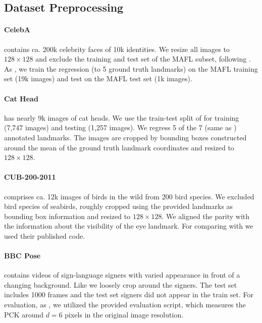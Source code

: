 \subsection{Dataset Preprocessing}
\paragraph{CelebA} \cite{liu15facewild} contains ca. 200k celebrity faces of 10k identities.
We resize all images to $128\times 128$ and exclude the training and test set of the MAFL subset, following \cite{thewlis17}.
As  \cite{thewlis17, zhang18}, we train the regression (to 5 ground truth landmarks) on the MAFL training set (19k images) and test on the MAFL test set (1k images).

\paragraph{Cat Head} \cite{zhang08cathead}  has nearly 9k images of cat heads.
We use the train-test split of \cite{zhang18} for training (7,747 images) and testing (1,257 images).
We regress 5 of the 7 (same as \cite{zhang18}) annotated landmarks.
The images are cropped by bounding boxes constructed around the mean of the ground truth landmark coordinates and resized to $128\times128$.


\paragraph{CUB-200-2011} \cite{wah11birds} comprises ca. 12k images of birds in the wild from 200 bird species.
We excluded bird species of seabirds, roughly cropped using the provided landmarks as bounding box information and resized to $128\times128$.
We aligned the parity with the information about the visibility of the eye landmark.
For comparing with \cite{zhang18} we used their published code.


\paragraph{BBC Pose} \cite{charles13bbcpose} contains videos of sign-language signers with varied appearance in front of a changing background. Like \cite{jakab18} we loosely crop around the signers.
The test set includes 1000 frames and the test set signers did not appear in the train set.
For evaluation, as \cite{jakab18}, we utilized the provided evaluation script, which measures the PCK around $d=6$ pixels in the original image resolution.


